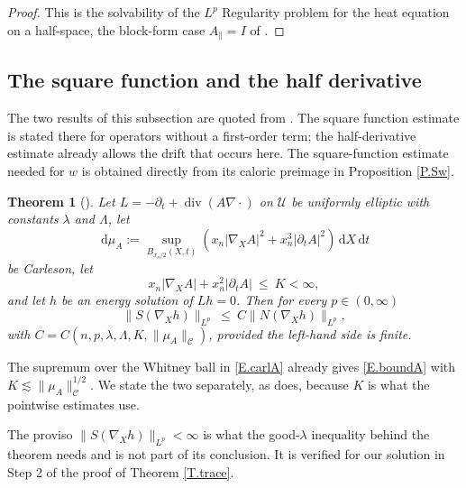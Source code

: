 \documentclass[12pt,leqno]{amsart}
\numberwithin{equation}{section}
\DeclareMathOperator{\divg}{div}
\newcommand{\abs}[1]{\left\vert#1\right\vert}
\newcommand{\br}[1]{\left(#1\right)}
\newcommand{\pd}{\partial}
\newcommand{\Uc}{\mathcal U}
\newcommand{\Cc}{\mathcal C}
\renewcommand{\d}{\,\mathrm d}
\newcommand{\Cnorm}[1]{\|#1\|_{\Cc}}
\theoremstyle{plain}
\newtheorem{theorem}[equation]{Theorem}
\theoremstyle{remark}
\begin{document}
\begin{proof}
This is the solvability of the $L^p$ Regularity problem for the heat
equation on a half-space, the block-form case $A_\parallel=I$ of
\cite[Theorem 1.8]{DLP}.
\end{proof}

\subsection{The square function and the half derivative}\label{ss.NEU}

The two results of this subsection are quoted from \cite{DLPN}. The square
function estimate is stated there for operators without a first-order term;
the half-derivative estimate already allows the drift that occurs here. The
square-function estimate needed for $w$ is obtained directly from its caloric
preimage in Proposition \ref{P.Sw}.

\begin{theorem}[{\cite[Theorem 7.1]{DLPN}}]\label{T.SN}
Let $L=-\pd_t+\divg(A\nabla\cdot)$ on $\Uc$ be uniformly elliptic with
constants $\lambda$ and $\Lambda$, let
\begin{equation}\label{E.carlA}
  \d\mu_A:=\sup_{B_{x_n/2}(X,t)}\br{x_n\abs{\nabla_XA}^2
   +x_n^3\abs{\pd_tA}^2}\d X\d t
\end{equation}
be Carleson, let
\begin{equation}\label{E.boundA}
  x_n\abs{\nabla_XA}+x_n^2\abs{\pd_tA}\ \le\ K<\infty ,
\end{equation}
and let $h$ be an energy solution of $Lh=0$. Then for
every $p\in(0,\infty)$
$$\big\|S(\nabla_Xh)\big\|_{L^p}\ \le\ C\big\|N(\nabla_Xh)\big\|_{L^p},$$
with $C=C(n,p,\lambda,\Lambda,K,\Cnorm{\mu_A})$, provided the left-hand side is
finite.
\end{theorem}

\noindent The supremum over the Whitney ball in \eqref{E.carlA} already gives
\eqref{E.boundA} with $K\lesssim\Cnorm{\mu_A}^{1/2}$. We state the two
separately, as \cite{DLPN} does, because $K$ is what the pointwise estimates
use.

\noindent The proviso $\|S(\nabla_Xh)\|_{L^p}<\infty$ is what the good-$\lambda$
inequality behind the theorem needs and is not part of its conclusion. It is
verified for our solution in Step 2 of the proof of Theorem \ref{T.trace}.
\end{document}
